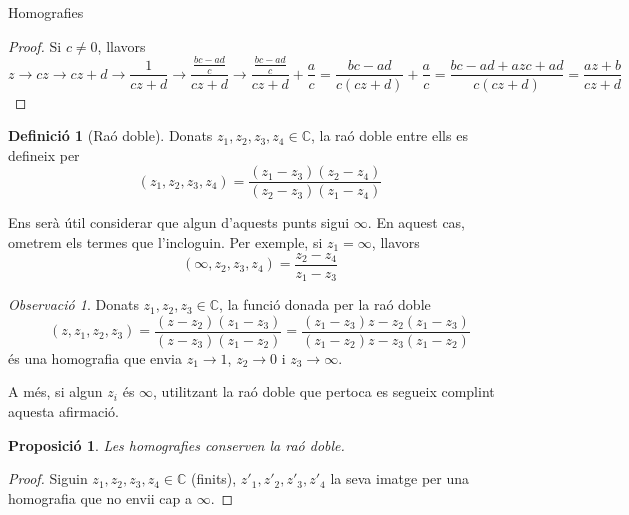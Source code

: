 \documentclass[dvipsnames, svgnames]{article}
\numberwithin{equation}{section}
\newtheorem{proposition}[theorem]{Proposició}
\theoremstyle{definition}
\newtheorem*{definition}{Definició}
\theoremstyle{remark}
\newtheorem*{remark}{Observació}
\newcommand{\C}{\mathbb{C}}
\begin{document}
\begin{section}{Homografies}
\begin{proof}
            Si $c\neq0$, llavors \begin{displaymath}
                z\to cz\to cz+d\to \frac{1}{cz+d}\to \frac{\frac{bc-ad}{c}}{cz+d}\to \frac{\frac{bc-ad}{c}}{cz+d}+\frac{a}{c}=\frac{bc-ad}{c(cz+d)}+\frac{a}{c}=\frac{bc-ad+azc+ad}{c(cz+d)}=\frac{az+b}{cz+d}
            \end{displaymath}
        \end{proof}
        \begin{definition}[Raó doble]
            Donats $z_1,z_2,z_3,z_4\in\mathbb{C}$, la raó doble entre ells es defineix per \begin{displaymath}
                (z_1,z_2,z_3,z_4) = \frac{(z_1-z_3)(z_2-z_4)}{(z_2-z_3)(z_1-z_4)}
            \end{displaymath}
            
            Ens serà útil considerar que algun d'aquests punts sigui $\infty$. En aquest cas, ometrem els termes que l'incloguin. Per exemple, si $z_1 = \infty$, llavors \begin{displaymath}
                (\infty, z_2,z_3,z_4) = \frac{z_2-z_4}{z_1-z_3}
            \end{displaymath}
        \end{definition}
    \begin{remark}
        Donats $z_1,z_2,z_3\in\mathbb{C}$, la funció donada per la raó doble \begin{equation}\label{eq:rao_doble}
            (z,z_1,z_2,z_3) = \frac{(z-z_2)(z_1-z_3)}{(z-z_3)(z_1-z_2)}=\frac{(z_1-z_3)z-z_2(z_1-z_3)}{(z_1-z_2)z-z_3(z_1-z_2)}
        \end{equation}
        és una homografia que envia $z_1\to1$, $z_2\to0$ i $z_3\to\infty$.

        A més, si algun $z_i$ és $\infty$, utilitzant la raó doble que pertoca es segueix complint aquesta afirmació.
    \end{remark}
    \begin{proposition}
        Les homografies conserven la raó doble.
    \end{proposition}
    \begin{proof}
        Siguin $z_1,z_2,z_3,z_4\in \C$ (finits), $z'_1,z'_2,z'_3,z'_4$ la seva imatge per una homografia que no envii cap a $\infty$.


\end{proof}
\end{section}
\end{document}
